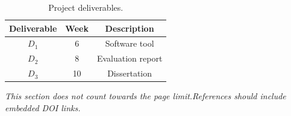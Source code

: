 \documentclass[a4paper,11pt]{article}
\begin{document}
\begin{table}[htbp]
\centering
\begin{tabular}{@{}ccc@{}}
\toprule
\textbf{Deliverable} & \textbf{Week} & \textbf{Description} \\
\midrule
$D_1$ & 6  & Software tool \\
$D_2$ & 8  & Evaluation report \\
$D_3$ & 10 & Dissertation \\
\bottomrule
\end{tabular}
\caption{Project deliverables.}
\label{fig:deliverables}
\end{table}




{\small


\textit{This section does not count towards the page limit.References should include embedded DOI links.}

}
\end{document}
